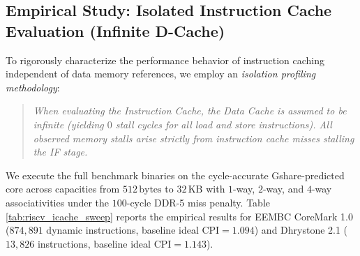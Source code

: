 \begin{table}[htbp]
\centering
{}
\caption{Silicon area and standard-cell gate counts for parameterized L1 caches in ASAP7 7\,nm FinFET.}\label{tab:riscv_cache_area}
\end{table}

\subsection{Empirical Study: Isolated Instruction Cache Evaluation (Infinite D-Cache)}\label{riscvIcacheStudy}

To rigorously characterize the performance behavior of instruction caching independent of data memory references, we employ an \textit{isolation profiling methodology}:
\begin{quote}
\textit{When evaluating the Instruction Cache, the Data Cache is assumed to be infinite (yielding $0$ stall cycles for all load and store instructions). All observed memory stalls arise strictly from instruction cache misses stalling the IF stage.}
\end{quote}

We execute the full benchmark binaries on the cycle-accurate Gshare-predicted core across capacities from $512\,\text{bytes}$ to $32\,\text{KB}$ with $1$-way, $2$-way, and $4$-way associativities under the $100$-cycle DDR-5 miss penalty. Table \ref{tab:riscv_icache_sweep} reports the empirical results for EEMBC CoreMark 1.0 ($874,891$ dynamic instructions, baseline ideal $\text{CPI} = 1.094$) and Dhrystone 2.1 ($13,826$ instructions, baseline ideal $\text{CPI} = 1.143$).

